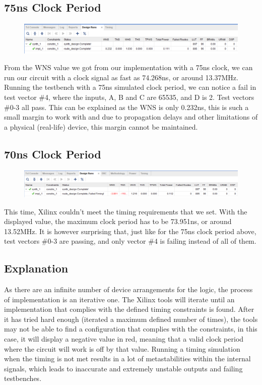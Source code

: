 \documentclass[11pt]{report}
\begin{document}
\subsection*{75ns Clock Period}
\begin{figure}[H]
    \includegraphics[width=\columnwidth]{Waveforms/75ns_design-runs.png}
\end{figure}
From the WNS value we got from our implementation with a 75ns clock, we can run our circuit with a clock signal as fast as 74.268ns, or around 13.37MHz. Running the testbench with a 75ns simulated clock period, we can notice a fail in test vector \#4, where the inputs, A, B and C are 65535, and D is 2. Test vectors \#0-3 all pass. This can be explained as the WNS is only 0.232ns, this is such a small margin to work with and due to propagation delays and other limitations of a physical (real-life) device, this margin cannot be maintained.

\subsection*{70ns Clock Period}
\begin{figure}[H]
    \includegraphics[width=\columnwidth]{Waveforms/70ns_design-runs.png}
\end{figure}
This time, Xilinx couldn't meet the timing requirements that we set. With the displayed value, the maximum clock period has to be 73.951ns, or around 13.52MHz. It is however surprising that, just like for the 75ns clock period above, test vectors \#0-3 are passing, and only vector \#4 is failing instead of all of them.

\subsection*{Explanation}
As there are an infinite number of device arrangements for the logic, the process of implementation is an iterative one. The Xilinx tools will iterate until an implementation that complies with the defined timing constraints is found. After it has tried hard enough (iterated a maximum defined number of times), the tools may not be able to find a configuration that complies with the constraints, in this case, it will display a negative value in red, meaning that a valid clock period where the circuit will work is off by that value. Running a timing simulation when the timing is not met results in a lot of metastabilities within the internal signals, which leads to inaccurate and extremely unstable outputs and failing testbenches.
\end{document}
